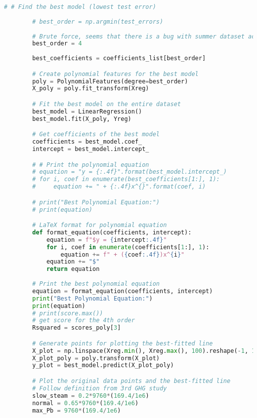 \begin{lstlisting}[language=Python]
        # # Find the best model (lowest test error)
        
        # best_order = np.argmin(test_errors)
        
        # Brute force, seems that there is a bug with summer dataset actual dataset, in general order 4 is the most acceptable performance  
        best_order = 4
        
        best_coefficients = coefficients_list[best_order]

        # Create polynomial features for the best model
        poly = PolynomialFeatures(degree=best_order)
        X_poly = poly.fit_transform(Xreg)

        # Fit the best model on the entire dataset
        best_model = LinearRegression()
        best_model.fit(X_poly, Yreg)

        # Get coefficients of the best model
        coefficients = best_model.coef_
        intercept = best_model.intercept_

        # # Print the polynomial equation
        # equation = "y = {:.4f}".format(best_model.intercept_)
        # for i, coef in enumerate(best_coefficients[1:], 1):
        #     equation += " + {:.4f}x^{}".format(coef, i)

        # print("Best Polynomial Equation:")
        # print(equation)

        # LaTeX format for polynomial equation
        def format_equation(coefficients, intercept):
            equation = f"$y = {intercept:.4f}"
            for i, coef in enumerate(coefficients[1:], 1):
                equation += f" + ({coef:.4f})x^{i}"
            equation += "$"
            return equation
        
        # Print the best polynomial equation
        equation = format_equation(coefficients, intercept)
        print("Best Polynomial Equation:")
        print(equation)
        # print(score.max())
        # get score for the 4th order
        Rsquared = scores_poly[3]

        # Generate points for plotting the best-fitted line
        X_plot = np.linspace(Xreg.min(), Xreg.max(), 100).reshape(-1, 1)
        X_plot_poly = poly.transform(X_plot)
        y_plot = best_model.predict(X_plot_poly)

        # Plot the original data points and the best-fitted line
        # Follow definition from 3rd GHG study
        slow_steam = 0.2*9760*(169.4/1e6)
        normal = 0.65*9760*(169.4/1e6)
        max_Pb = 9760*(169.4/1e6)


\end{lstlisting}
